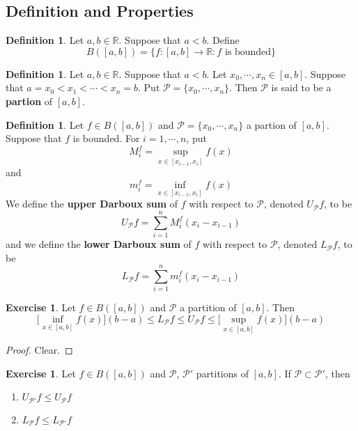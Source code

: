 \documentclass[12pt]{amsart}
\theoremstyle{definition}
\newtheorem{defn}[definition]{Definition}
\newtheorem{ex}[definition]{Exercise}
\newcommand{\R}{\mathbb{R}}
\newcommand{\MP}{\mathcal{P}}
\newcommand{\lex}[1]{\label{ex:#1}}
\newcommand{\ld}[1]{\label{defn:#1}}
\begin{document}
	\subsection{Definition and Properties}
	\begin{defn} \ld{00000} 
		Let $a,b \in \R$. Suppose that $a<b$. Define $$B([a,b]) = \{f:[a,b] \rightarrow \R: f\text{ is bounded}\}$$
	\end{defn}
	
	\begin{defn} \ld{00000} 
		Let $a,b \in \R$. Suppose that $a<b$. Let $x_0, \cdots, x_n \in [a,b]$. Suppose that $a= x_0 < x_1 < \cdots < x_n = b$. Put $\MP = \{x_0, \cdots, x_n\}$. Then $\MP$ is said to be a \textbf{partion} of $[a,b]$. 
	\end{defn}
	
	\begin{defn} \ld{00000} 
		Let $f \in B([a,b])$ and $\MP = \{x_0, \cdots, x_n\}$ a partion of $[a,b]$. Suppose that $f$ is bounded. For $i = 1, \cdots, n$, put 
		$$M^f_i = \sup_{x \in [x_{i-1}, x_i]} f(x)$$ and 
		$$m^f_i = \inf_{x \in [x_{i-1}, x_i]} f(x)$$ 
		We define the \textbf{upper Darboux sum} of $f$ with respect to $\MP$, denoted $U_\MP f$, to be $$U_\MP f = \sum_{i=1}^n M^f_i (x_i - x_{i-1})$$ 
		and we define the \textbf{lower Darboux sum} of $f$ with respect to $\MP$, denoted $L_\MP f$, to be
		$$L_\MP f = \sum_{i=1}^n m^f_i (x_i - x_{i-1})$$ 
	\end{defn}

	\begin{ex} \lex{00000} 
		Let $f \in B([a,b])$ and $\MP$ a partition of $[a,b]$. Then $$\bigg[\inf_{x \in [a,b]} f(x) \bigg] (b-a) \leq L_\MP f \leq U_\MP f \leq \bigg[ \sup_{x \in [a,b]} f(x)  \bigg] (b-a)$$
	\end{ex}

	\begin{proof}
		Clear.
	\end{proof}

	\begin{ex} \lex{00000} 
			Let $f \in B([a,b])$ and $\MP$, $\MP'$ partitions of $[a,b]$. If $\MP \subset \MP'$, then 
			\begin{enumerate}
				\item $U_{\MP'} f \leq U_{\MP} f$
				\item $L_{\MP} f \leq L_{\MP'} f$
			\end{enumerate}
	\end{ex}
\end{document}
